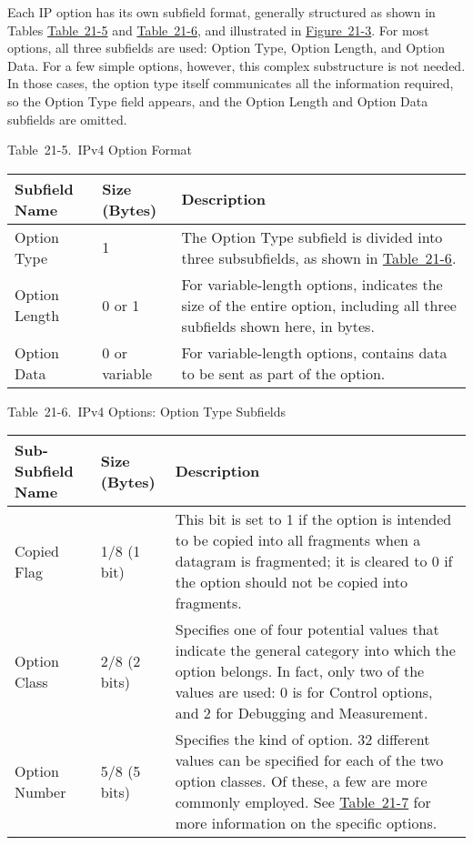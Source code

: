 Each IP option has its own subfield format, generally structured as
shown in Tables
\protect\hyperlink{ch21s03.htmlux5cux23ipv_option_format}{Table~21-5}
and
\protect\hyperlink{ch21s03.htmlux5cux23ipv_options_option_type_subfields}{Table~21-6},
and illustrated in
\protect\hyperlink{ch21s03.htmlux5cux23ipv4_options_field_format_this_diagram_s}{Figure~21-3}.
For most options, all three subfields are used: Option
\protect\hypertarget{ch21s03.htmlux5cux23idx-CHP-21-0790}{}{}Type,
Option Length, and Option Data. For a few simple options, however, this
complex substructure is not needed. In those cases, the option type
itself communicates all the information required, so the Option Type
field appears, and the Option Length and Option Data subfields are
omitted.

\protect\hypertarget{ch21s03.htmlux5cux23ipv_option_format}{}{}

Table~21-5.~IPv4 Option Format

\begin{longtable}[]{@{}lll@{}}
\toprule
Subfield Name & Size (Bytes) & Description\tabularnewline
\midrule
\endhead
Option Type & 1 & The Option Type subfield is divided into three
subsubfields, as shown in
\protect\hyperlink{ch21s03.htmlux5cux23ipv_options_option_type_subfields}{Table~21-6}.\tabularnewline
Option Length & 0 or 1 & For variable-length
\protect\hypertarget{ch21s03.htmlux5cux23idx-CHP-21-0791}{}{}options,
indicates the size of the entire option, including all three subfields
shown here, in bytes.\tabularnewline
Option Data & 0 or variable & For variable-length
\protect\hypertarget{ch21s03.htmlux5cux23idx-CHP-21-0792}{}{}options,
contains data to be sent as part of the option.\tabularnewline
\bottomrule
\end{longtable}

\protect\hypertarget{ch21s03.htmlux5cux23ipv_options_option_type_subfields}{}{}

Table~21-6.~IPv4 Options: Option Type Subfields

\begin{longtable}[]{@{}lll@{}}
\toprule
Sub-Subfield Name & Size (Bytes) & Description\tabularnewline
\midrule
\endhead
Copied Flag & 1/8 (1 bit) & This bit is set to 1 if the option is
intended to be copied into all fragments when a datagram is fragmented;
it is cleared to 0 if the option should not be copied into
fragments.\tabularnewline
Option Class & 2/8 (2 bits) & Specifies one of four potential values
that indicate the general category into which the option belongs. In
fact, only two of the values are used: 0 is for Control options, and 2
for Debugging and Measurement.\tabularnewline
Option Number & 5/8 (5 bits) & Specifies the kind of option. 32
different values can be specified for each of the two option classes. Of
these, a few are more commonly employed. See
\protect\hyperlink{ch21s03.htmlux5cux23common_ipv_options}{Table~21-7}
for more information on the specific options.\tabularnewline
\bottomrule
\end{longtable}

